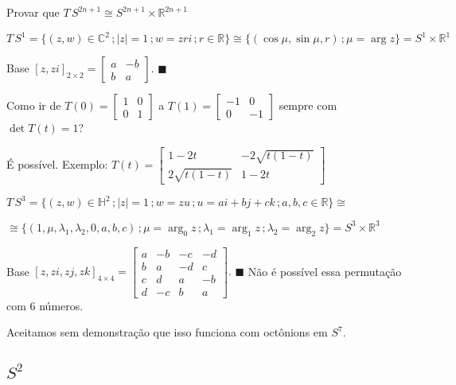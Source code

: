\documentclass[10pt,a4paper]{article}
\begin{document}
		Provar que $T\,S^{2n + 1} \cong S^{2n + 1} \times \mathbb{R}^{2n + 1}$

		\vspace{3mm}

		$T\,S^1 = \{ (z, w) \in \mathbb{C}^2 \,; |z| = 1\,; w = zri \,; r \in \mathbb{R}  \} \cong \{ (\cos \mu, \sin \mu, r) \,; \mu = \arg z \} = S^1 \times \mathbb{R}^1$

		Base $[z, zi]_{2 \times 2} = \left[ \begin{matrix} a & -b \\ b & a \end{matrix} \right].\,\,\blacksquare$

		Como ir de $T(0) = \left[ \begin{matrix} 1 & 0 \\ 0 & 1 \end{matrix} \right]$ a $T(1) = \left[ \begin{matrix} -1 & 0 \\ 0 & -1 \end{matrix} \right]$ sempre com $\det T(t) = 1$?

		\'E poss\'ivel. Exemplo: $T(t) = \left[ \begin{matrix} 1 - 2t & - 2\sqrt{t(1-t)} \\ 2\sqrt{t(1-t)} & 1 - 2t \end{matrix} \right]$

		\vspace{3mm}

		$T\,S^3 = \{ (z, w) \in \mathbb{H}^2 \,; |z| = 1\,; w = zu \,; u = ai + bj + ck \,; a,b,c \in \mathbb{R}  \} \cong $

		$ \cong \{ (1, \mu, \lambda_1, \lambda_2, 0, a, b, c) \,; \mu = \arg_0 z \,; \lambda_1 = \arg_1 z \,; \lambda_2 = \arg_2 z \} = S^3 \times \mathbb{R}^3$

		Base $[z, zi, zj, zk]_{4 \times 4} = \left[ \begin{matrix} a & -b & -c & -d \\ b & a & -d & c \\ c & d & a & -b \\ d & -c & b & a \end{matrix} \right].\,\,\blacksquare\,\,$N\~ao \'e poss\'ivel essa permuta\c{c}\~ao com 6 n\'umeros.

		\vspace{3mm}

		Aceitamos sem demonstra\c{c}\~ao que isso funciona com oct\^onions em $S^7$.

		\subsection{$S^2$}
		\begin{flushright}
		\end{flushright}
\end{document}
